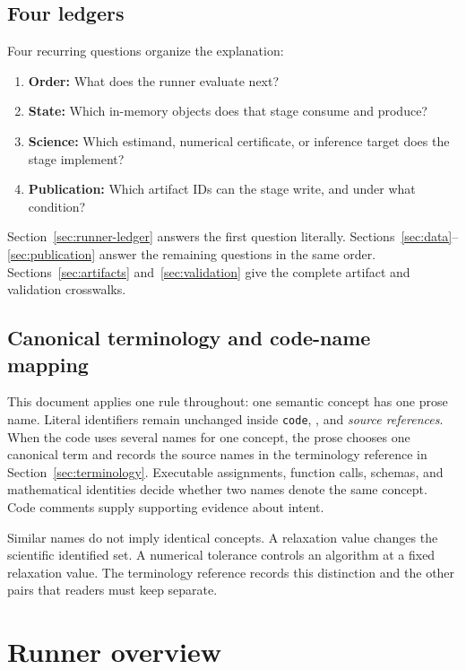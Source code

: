 \documentclass[11pt]{article}
\DeclareRobustCommand{\code}[1]{%
  \ifmmode\text{\ttfamily\detokenize{#1}}\else\nolinkurl{#1}\fi}
\DeclareRobustCommand{\file}[1]{\path{#1}}
\begin{document}
\subsection{Four ledgers}

Four recurring questions organize the explanation:
\begin{enumerate}
  \item \textbf{Order:} What does the runner evaluate next?
  \item \textbf{State:} Which in-memory objects does that stage consume and
    produce?
  \item \textbf{Science:} Which estimand, numerical certificate, or inference
    target does the stage implement?
  \item \textbf{Publication:} Which artifact IDs can the stage write, and under
    what condition?
\end{enumerate}
Section~\ref{sec:runner-ledger} answers the first question literally.
Sections~\ref{sec:data}--\ref{sec:publication} answer the remaining questions in
the same order. Sections~\ref{sec:artifacts} and~\ref{sec:validation} give the
complete artifact and validation crosswalks.

\subsection{Canonical terminology and code-name mapping}
\label{sec:terminology-rule}

This document applies one rule throughout: one semantic concept has one prose
name. Literal identifiers remain unchanged inside \code{code}, \file{paths},
and \emph{source references}. When the code uses several names for one concept,
the prose chooses one canonical term and records the source names in the
terminology reference in Section~\ref{sec:terminology}. Executable assignments,
function calls, schemas, and mathematical identities decide whether two names
denote the same concept. Code comments supply supporting evidence about intent.

Similar names do not imply identical concepts. A relaxation value changes the
scientific identified set. A numerical tolerance controls an algorithm at a
fixed relaxation value. The terminology reference records this distinction
and the other pairs that readers must keep separate.


\section{Runner overview}
\label{sec:runner}
\end{document}

